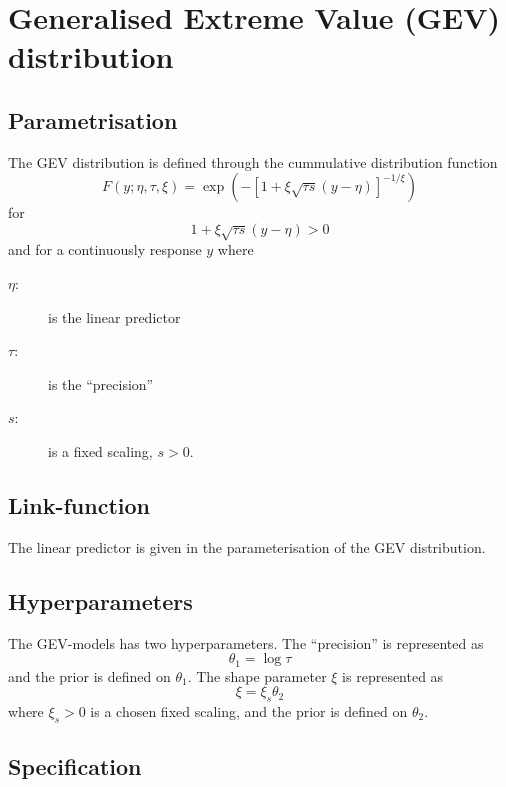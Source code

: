 \documentclass[a4paper,11pt]{article}
\begin{document}
\section*{Generalised Extreme Value (GEV) distribution}

\subsection*{Parametrisation}

The GEV distribution is defined through the cummulative distribution
function
\begin{displaymath}
    F(y; \eta, \tau, \xi) =
    \exp\left(
      - \left[ 1 + \xi \sqrt{\tau s} (y-\eta)\right]^{-1/\xi}
    \right)
\end{displaymath}
for
\begin{displaymath}
    1 + \xi \sqrt{\tau s} (y-\eta) > 0
\end{displaymath}
and for a continuously response $y$ where
\begin{description}
\item[$\eta$:] is the linear predictor
\item[$\tau$:] is the ``precision''
\item[$s$:] is a fixed scaling, $s>0$.    
\end{description}

\subsection*{Link-function}

The linear predictor is given in the parameterisation of the GEV
distribution.

\subsection*{Hyperparameters}

The GEV-models has two hyperparameters.
The ``precision'' is represented as
\begin{displaymath}
    \theta_{1} = \log \tau
\end{displaymath}
and the prior is defined on $\theta_{1}$.  The shape parameter $\xi$
is represented as
\begin{displaymath}
    \xi = \xi_{s}\theta_{2}
\end{displaymath}
where $\xi_{s} > 0$ is a chosen fixed scaling, and the prior is defined on
$\theta_{2}$.

\subsection*{Specification}
\end{document}
